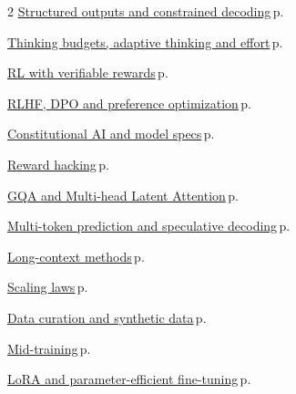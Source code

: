\documentclass[10pt,a4paper,openany]{report}
\begin{document}
\begin{multicols}{2}
\hyperref[c:context-9]{Structured outputs and constrained decoding}\,{\color{muted}\scriptsize p.\,\pageref{c:context-9}}\par\vspace{1pt}
\hyperref[c:reasoning-1]{Thinking budgets, adaptive thinking and effort}\,{\color{muted}\scriptsize p.\,\pageref{c:reasoning-1}}\par\vspace{1pt}
\hyperref[c:reasoning-2]{RL with verifiable rewards}\,{\color{muted}\scriptsize p.\,\pageref{c:reasoning-2}}\par\vspace{1pt}
\hyperref[c:reasoning-6]{RLHF, DPO and preference optimization}\,{\color{muted}\scriptsize p.\,\pageref{c:reasoning-6}}\par\vspace{1pt}
\hyperref[c:reasoning-7]{Constitutional AI and model specs}\,{\color{muted}\scriptsize p.\,\pageref{c:reasoning-7}}\par\vspace{1pt}
\hyperref[c:reasoning-9]{Reward hacking}\,{\color{muted}\scriptsize p.\,\pageref{c:reasoning-9}}\par\vspace{1pt}
\hyperref[c:arch-1]{GQA and Multi-head Latent Attention}\,{\color{muted}\scriptsize p.\,\pageref{c:arch-1}}\par\vspace{1pt}
\hyperref[c:arch-6]{Multi-token prediction and speculative decoding}\,{\color{muted}\scriptsize p.\,\pageref{c:arch-6}}\par\vspace{1pt}
\hyperref[c:arch-7]{Long-context methods}\,{\color{muted}\scriptsize p.\,\pageref{c:arch-7}}\par\vspace{1pt}
\hyperref[c:training-1]{Scaling laws}\,{\color{muted}\scriptsize p.\,\pageref{c:training-1}}\par\vspace{1pt}
\hyperref[c:training-3]{Data curation and synthetic data}\,{\color{muted}\scriptsize p.\,\pageref{c:training-3}}\par\vspace{1pt}
\hyperref[c:training-4]{Mid-training}\,{\color{muted}\scriptsize p.\,\pageref{c:training-4}}\par\vspace{1pt}
\hyperref[c:training-5]{LoRA and parameter-efficient fine-tuning}\,{\color{muted}\scriptsize p.\,\pageref{c:training-5}}\par\vspace{1pt}

\end{multicols}
\end{document}
